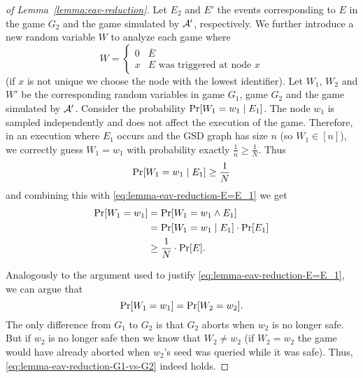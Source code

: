 \begin{proof}[of Lemma~\ref{lemma:eav-reduction}]
	Let $E_2$ and $E'$ the events corresponding to $E$ in the game $G_2$ and the game simulated by $\mathcal{A}'$, respectively. We further introduce a new random variable $W$ to analyze each game where
	\[
		W = \begin{cases}
			0 & \overline{E}                       \\
			x & E \text{ was triggered at node } x
		\end{cases}
	\]
	(if $x$ is not unique we choose the node with the lowest identifier).
	Let $W_1$, $W_2$ and $W'$ be the corresponding random variables in game $G_1$, game $G_2$ and the game simulated by $\mathcal{A}'$. Consider the probability $\pr{W_1 = w_1 \mid E_1}$. The node $w_1$ is sampled independently and does not affect the execution of the game. Therefore, in an execution where $E_1$ occurs and the GSD graph has size $n$ (so $W_1 \in [n]$), we correctly guess $W_1 = w_1$ with probability exactly $\frac{1}{n} \ge \frac{1}{N}$. Thus
	\[
		\pr{W_1 = w_1 \mid E_1} \ge \frac{1}{N}
	\]
	and combining this with \eqref{eq:lemma-eav-reduction-E=E_1} we get
	\begin{align} \label{eq:lemma-eav-reduction-detect-E1-G1}
		\begin{split}
			\pr{W_1 = w_1} & = \pr{W_1 = w_1 \land E_1} \\
			& = \pr{W_1 = w_1 \mid E_1} \cdot \pr{E_1} \\
			& \ge \frac{1}{N} \cdot \pr{E}.
		\end{split}
	\end{align}

	Analogously to the argument used to justify \eqref{eq:lemma-eav-reduction-E=E_1}, we can argue that
	\begin{equation} \label{eq:lemma-eav-reduction-G1-vs-G2}
		\pr{W_1 = w_1} = \pr{W_2 = w_2}.
	\end{equation}
	The only difference from $G_1$ to $G_2$ is that $G_2$ aborts when $w_2$ is no longer safe. But if $w_2$ is no longer safe then we know that $W_2 \neq w_2$ (if $W_2 = w_2$ the game would have already aborted when $w_2$'s seed was queried while it was safe). Thus, \eqref{eq:lemma-eav-reduction-G1-vs-G2} indeed holds.


\end{proof}
